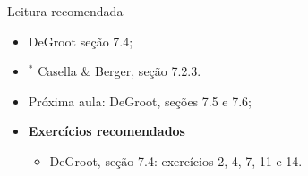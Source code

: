 \begin{frame}{Leitura recomendada}
\begin{itemize}
 \item[\faBook] DeGroot seção 7.4;
 \item[\faBook] $^\ast$ Casella \& Berger, seção 7.2.3.
 \item[\faForward] Próxima aula: DeGroot, seções 7.5 e 7.6;
 \item {\large\textbf{Exercícios recomendados}}
 \begin{itemize}
  \item[\faBookmark] DeGroot, seção 7.4: exercícios 2, 4, 7, 11 e 14.
  \end{itemize}
 \end{itemize} 
\end{frame}


